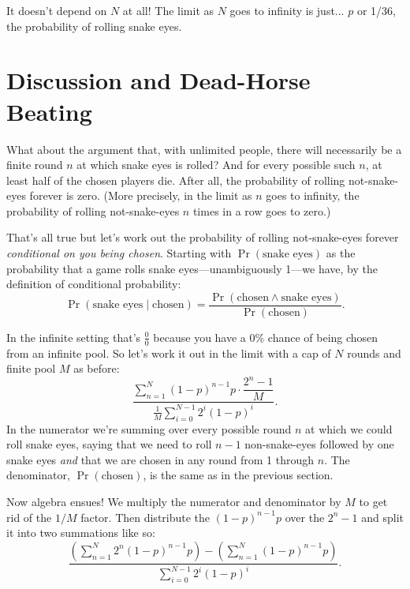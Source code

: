 \documentclass[article,twocolumn]{memoir}
\begin{document}
It doesn't depend on $N$ at all!
The limit as $N$ goes to infinity is just... 
$p$ or 1/36, the probability of rolling snake eyes.
\qedsymbol{}

\chapter*{Discussion and Dead-Horse Beating}

What about the argument that, with unlimited people, there will necessarily be a finite round $n$ at which snake eyes is rolled?
And for every possible such $n$, at least half of the chosen players die.
After all, the probability of rolling not-snake-eyes forever is zero. 
(More precisely, in the limit as $n$ goes to infinity, the probability of rolling not-snake-eyes $n$ times in a row goes to zero.)

That's all true but let's work out the probability of rolling not-snake-eyes forever \emph{conditional on you being chosen}.
Starting with $\Pr(\text{snake eyes})$ as the probability that a game rolls snake eyes---unambiguously 1---we have, by the definition of conditional probability:
\begin{equation*}
\Pr(\text{snake eyes} \mid \text{chosen} )
= \frac{\Pr(\text{chosen} \land \text{snake eyes})}{\Pr(\text{chosen})}.
\end{equation*}

In the infinite setting that's
$\tfrac{0}{0}$
because you have a 0\% chance of being chosen from an infinite pool.
So let's work it out in the limit with a cap of $N$ rounds and finite pool $M$ as before:
$$
\dfrac{\sum\limits_{n=1}^{N}(1-p)^{n-1}p \cdot\dfrac{2^n-1}{M}}
{\tfrac{1}{M}\sum\limits_{i=0}^{N-1}2^{i}(1-p)^{i}}.
$$
In the numerator we're summing over every possible round $n$ at which we could roll snake eyes, saying that we need to roll $n-1$ non-snake-eyes followed by one snake eyes \emph{and} that we are chosen in any round from 1 through $n$.
The denominator, $\Pr(\text{chosen})$, is the same as in the previous section.

Now algebra ensues!
We multiply the numerator and denominator by $M$ to get rid of the $1/M$ factor.
Then distribute the $(1-p)^{n-1}p$ over the $2^n-1$ and split it into two summations like so:
$$
\dfrac{
\left(\sum\limits_{n=1}^{N}2^n(1-p)^{n-1}p\right) -
\left(\sum\limits_{n=1}^{N}(1-p)^{n-1}p \right)
}
{\sum\limits_{i=0}^{N-1}2^{i}(1-p)^{i}}.
$$
\end{document}
